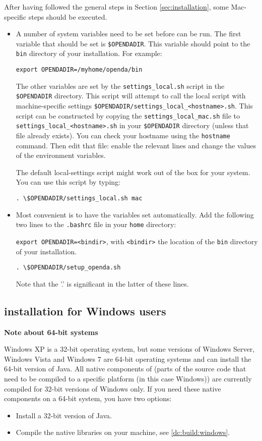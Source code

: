 After having followed the general steps in Section \ref{sec:installation}, some Mac-specific steps should be executed.
\begin{itemize}
\item A number of system variables need to be set before \oda can be run. The first variable that should be set is \verb|$OPENDADIR|. This variable should point to the \verb|bin| directory of your \oda installation. For example:

\verb|export OPENDADIR=/myhome/openda/bin|

The other variables are set by the \verb|settings_local.sh| script in the \verb|$OPENDADIR| directory. This script will attempt to call the local script with machine-specific settings \verb|$OPENDADIR/settings_local_<hostname>.sh|. This script can be constructed by copying the \verb|settings_local_mac.sh| file to \verb|settings_local_<hostname>.sh| in your \verb|$OPENDADIR| directory (unless that file already exists). You can check your hostname using the \verb|hostname| command. Then edit that file: enable the relevant lines and change the values of the environment variables.

The default local-settings script might work out of the box for your system. You can use this script by typing:

\verb|. \$OPENDADIR/settings_local.sh mac|
\item Most convenient is to have the variables set automatically. Add the following two lines to the \verb|.bashrc| file in your \verb|home| directory:

\verb|export OPENDADIR=<bindir>|, with \verb|<bindir>| the location of the \verb|bin| directory of your \oda installation.

\verb|. \$OPENDADIR/setup_openda.sh|

Note that the '.' is significant in the latter of these lines.
\end{itemize}

\subsection{\oda installation for Windows users}
\textbf{Note about 64-bit systems}

Windows XP is a 32-bit operating system, but some versions of Windows Server, Windows Vista and Windows 7 are 64-bit operating systems and can install the 64-bit version of Java. All native components of \oda (parts of the source code that need to be compiled to a specific platform (in this case Windows)) are currently compiled for 32-bit versions of Windows only. If you need these native components on a 64-bit system, you have two options:
\begin{itemize}
\item Install a 32-bit version of Java.
\item Compile the native libraries on your machine, see \ref{dc:build:windows}.
\end{itemize}

